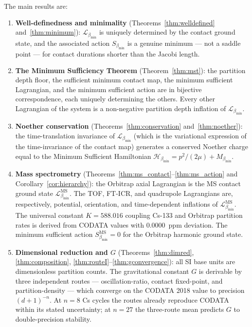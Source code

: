 \documentclass[12pt, a4paper]{article}
\theoremstyle{plain}
\theoremstyle{definition}
\theoremstyle{remark}
\newcommand{\bmin}{\beta_{\min}}
\newcommand{\Lmin}{\mathcal{L}_{\bmin}}
\newcommand{\Smin}{S_{\bmin}}
\newcommand{\Hmin}{\mathcal{H}_{\bmin}}
\begin{document}
The main results are:

\begin{enumerate}
\item \textbf{Well-definedness and minimality} (Theorems~\ref{thm:welldefined}
  and~\ref{thm:minimum}): $\Lmin$ is uniquely determined by the contact ground
  state, and the associated action $\Smin$ is a genuine minimum --- not a
  saddle point --- for contact durations shorter than the Jacobi length.

\item \textbf{The Minimum Sufficiency Theorem} (Theorem~\ref{thm:mst}): the
  partition depth floor, the sufficient minimum contact map, the minimum
  sufficient Lagrangian, and the minimum sufficient action are in bijective
  correspondence, each uniquely determining the others. Every other Lagrangian
  of the system is a non-negative partition depth inflation of $\Lmin$.

\item \textbf{Noether conservation} (Theorems~\ref{thm:conservation}
  and~\ref{thm:noether}): the time-translation invariance of $\Lmin$ (which
  is the variational expression of the time-invariance of the contact map)
  generates a conserved Noether charge equal to the Minimum Sufficient
  Hamiltonian $\Hmin = p^2/(2\mu) + M_{\bmin}$.

\item \textbf{Mass spectrometry} (Theorems~\ref{thm:ms_contact}--\ref{thm:ms_action}
  and Corollary~\ref{cor:hierarchy}): the Orbitrap axial Lagrangian is the
  MS contact ground state $\Lmin^{\mathrm{MS}}$. The TOF, FT-ICR, and
  quadrupole Lagrangians are, respectively, potential, orientation, and
  time-dependent inflations of $\Lmin^{\mathrm{MS}}$. The universal constant
  $K = 588.016$ coupling Cs-133 and Orbitrap partition rates is derived from
  CODATA values with $0.0000$~ppm deviation. The minimum sufficient action
  $\Smin^{\mathrm{MS}} = 0$ for the Orbitrap harmonic ground state.

\item \textbf{Dimensional reduction and $G$} (Theorems~\ref{thm:dimred},
  \ref{thm:composition}, \ref{thm:routeI}--\ref{thm:gconvergence}): all SI
  base units are dimensionless partition counts. The gravitational constant $G$
  is derivable by three independent routes --- oscillation-ratio, contact
  fixed-point, and partition-density --- which converge on the CODATA 2018
  value to precision $(d+1)^{-n}$. At $n = 8$ Cs cycles the routes already
  reproduce CODATA within its stated uncertainty; at $n = 27$ the three-route
  mean predicts $G$ to double-precision stability.


\end{enumerate}
\end{document}
